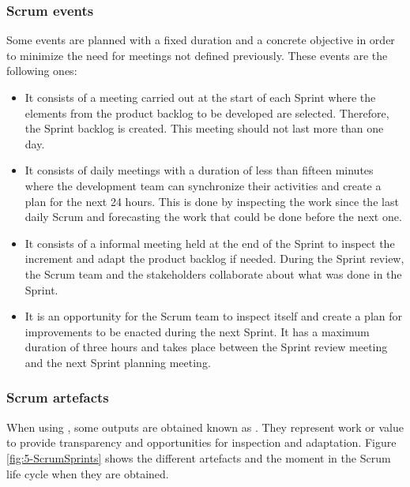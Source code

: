 \subsubsection{Scrum events}
Some events are planned with a fixed duration and a concrete objective in order to minimize the need for meetings not defined previously. These events are the following ones:

\begin{itemize}
	\item {} It consists of a meeting carried out at the start of each Sprint where the elements from the product backlog to be developed are selected. Therefore, the Sprint backlog is created. This meeting should not last more than one day.
	
	\item {} It consists of daily meetings with a duration of less than fifteen minutes where the development team can synchronize their activities and create a plan for the next 24 hours. This is done by inspecting the work since the last daily Scrum and forecasting the work that could be done before the next one.
	
	\item {} It consists of a informal meeting held at the end of the Sprint to inspect the increment and adapt the product backlog if needed. During the Sprint review, the Scrum team and the stakeholders collaborate about what was done in the Sprint.
	
	\item {} It is an opportunity for the Scrum team to inspect itself and create a plan for improvements to be enacted during the next Sprint. It has a maximum duration of three hours and takes place between the Sprint review meeting and the next Sprint planning meeting.
\end{itemize}


\subsubsection{Scrum artefacts}
When using , some outputs are obtained known as . They represent work or value to provide transparency and opportunities for inspection and adaptation. Figure \ref{fig:5-ScrumSprints} shows the different artefacts and the moment in the Scrum life cycle when they are obtained.

